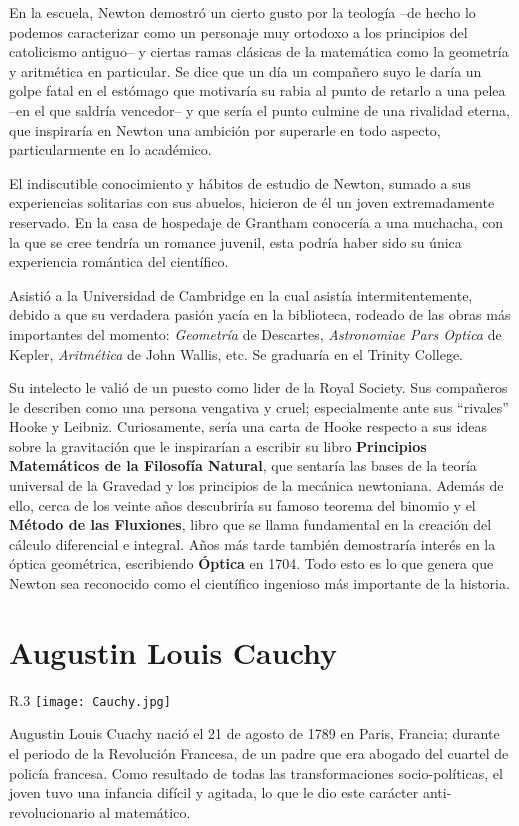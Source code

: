 \documentclass[11pt,oneside,a4paper]{book}
\begin{document}
En la escuela, Newton demostró un cierto gusto por la teología --de hecho lo podemos caracterizar como un personaje muy ortodoxo a los principios del catolicismo antiguo-- y ciertas ramas clásicas de la matemática como la geometría y aritmética en particular. Se dice que un día un compañero suyo le daría un golpe fatal en el estómago que motivaría su rabia al punto de retarlo a una pelea --en el que saldría vencedor-- y que sería el punto culmine de una rivalidad eterna, que inspiraría en Newton una ambición por superarle en todo aspecto, particularmente en lo académico.

El indiscutible conocimiento y hábitos de estudio de Newton, sumado a sus experiencias solitarias con sus abuelos, hicieron de él un joven extremadamente reservado. En la casa de hospedaje de Grantham conocería a una muchacha, con la que se cree tendría un romance juvenil, esta podría haber sido su única experiencia romántica del científico.

Asistió a la Universidad de Cambridge en la cual asistía intermitentemente, debido a que su verdadera pasión yacía en la biblioteca, rodeado de las obras más importantes del momento: \textit{Geometría} de Descartes, \textit{Astronomiae Pars Optica} de Kepler, \textit{Aritmética} de John Wallis, etc. Se graduaría en el Trinity College.

Su intelecto le valió de un puesto como lider de la Royal Society. Sus compañeros le describen como una persona vengativa y cruel; especialmente ante sus ``rivales'' Hooke y Leibniz. Curiosamente, sería una carta de Hooke respecto a sus ideas sobre la gravitación que le inspirarían a escribir su libro \textbf{Principios Matemáticos de la Filosofía Natural}, que sentaría las bases de la teoría universal de la Gravedad y los principios de la mecánica newtoniana. Además de ello, cerca de los veinte años descubriría su famoso teorema del binomio y el \textbf{Método de las Fluxiones}, libro que se llama fundamental en la creación del cálculo diferencial e integral. Años más tarde también demostraría interés en la óptica geométrica, escribiendo \textbf{Óptica} en 1704. Todo esto es lo que genera que Newton sea reconocido como el científico ingenioso más importante de la historia.

\section{Augustin Louis Cauchy}
\begin{wrapfigure}{R}{.3\textwidth}
\texttt{[image: Cauchy.jpg]}
\caption{}
\end{wrapfigure}
Augustin Louis Cuachy nació el 21 de agosto de 1789 en Paris, Francia; durante el periodo de la Revolución Francesa, de un padre que era abogado del cuartel de policía francesa. Como resultado de todas las transformaciones socio-políticas, el joven tuvo una infancia difícil y agitada, lo que le dio este carácter anti-revolucionario al matemático.
\end{document}
